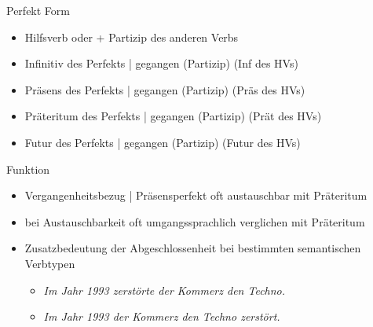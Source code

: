 \begin{frame}
  {Perfekt}
  \onslide<+->
  \onslide<+->
  Form\\
  \Viertelzeile
  \begin{itemize}[<+->]
    \item Hilfsverb  oder  + \alert{Partizip} des anderen Verbs
      \Halbzeile
    \item Infinitiv des Perfekts | \alert{gegangen} (Partizip)  (Inf des HVs)
    \item Präsens des Perfekts | \alert{gegangen} (Partizip)  (Präs des HVs)
    \item Präteritum des Perfekts | \alert{gegangen} (Partizip)  (Prät des HVs)
    \item Futur des Perfekts | \alert{gegangen} (Partizip)  (Futur des HVs)
  \end{itemize}
  \onslide<+->
  \Halbzeile
  Funktion\\
  \Viertelzeile
  \begin{itemize}[<+->]
    \item Vergangenheitsbezug | Präsensperfekt oft austauschbar mit Präteritum
    \item bei Austauschbarkeit oft umgangssprachlich verglichen mit Präteritum
    \item Zusatzbedeutung der Abgeschlossenheit bei bestimmten semantischen Verbtypen
      \begin{itemize}[<+->]
        \item \textit{Im Jahr 1993 \alert{zerstörte} der Kommerz den Techno.} 
        \item \textit{Im Jahr 1993  der Kommerz den Techno \alert{zerstört}.} 
      \end{itemize}
  \end{itemize}
\end{frame}

